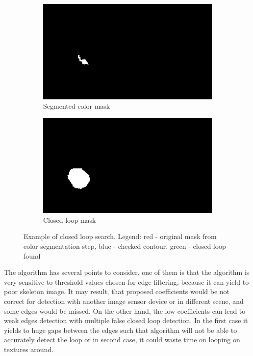 \documentclass{ctuthesis}
\begin{document}
\begin{figure}[htbp]
     \centering
     \begin{subfigure}{0.475\textwidth}
         \centering
         \includegraphics[width=\textwidth]{mask.png}
         \caption{Segmented color mask}
         \label{fig:scm}
     \end{subfigure}
     \hfill
     \begin{subfigure}{0.475\textwidth}
         \centering
         \includegraphics[width=\textwidth]{loop mask.png}
         \caption{Closed loop mask}
         \label{fig:clm}
     \end{subfigure}

        \caption{Example of closed loop search. Legend: red - original mask from color segmentation step, blue - checked contour, green - closed loop found}
        \label{fig:gc-q}
\end{figure}

The algorithm has several points to consider, one of them is that the algorithm is very sensitive to threshold values chosen for edge filtering, because it can yield to poor skeleton image. It may result, that proposed coefficients would be not correct for detection with another image sensor device or in different scene, and some edges would be missed. On the other hand, the low coefficients can lead to weak edges detection with multiple false closed loop detection.
In the first case it yields to huge gaps between the edges such that algorithm will not be able to accurately detect the loop or in second case, it could waste time on looping on textures around.
\end{document}
